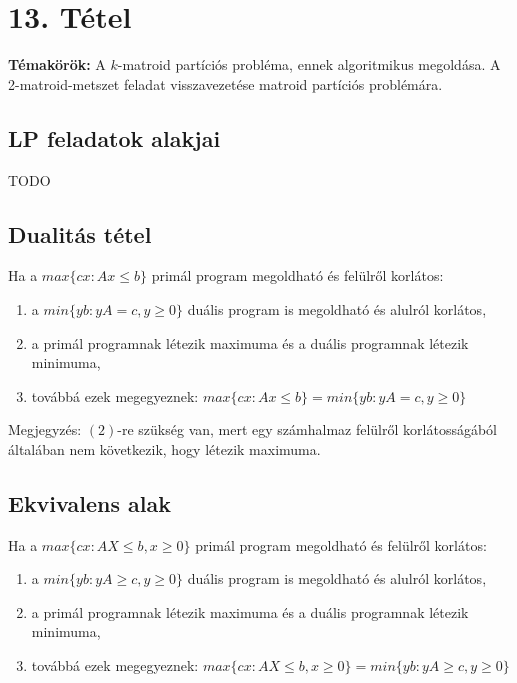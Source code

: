 
\setcounter{chapter}{13}
\chapter*{13. Tétel}

\textbf{Témakörök:} A $k$-matroid partíciós probléma, ennek algoritmikus megoldása. A 2-matroid-metszet feladat visszavezetése matroid partíciós problémára.

\noindent\hrulefill

\section*{LP feladatok alakjai}

\begin{theo} TODO \end{theo}

\section*{Dualitás tétel}

\begin{theo} 
Ha a $max \lbrace c x: Ax\leq b\rbrace$ primál program megoldható és felülről korlátos:
\begin{enumerate}
\item	a $min \lbrace yb: yA=c,y\geq 0\rbrace$ duális program is megoldható és alulról korlátos,
\item	a primál programnak létezik maximuma és a duális programnak létezik minimuma,
\item	továbbá ezek megegyeznek: $max\lbrace cx: Ax\leq b\rbrace = min\lbrace yb: yA=c,y\geq 0\rbrace$
\end{enumerate}
\end{theo}
Megjegyzés: $(2)$-re szükség van, mert egy számhalmaz felülről korlátosságából általában nem következik, hogy létezik maximuma.

\section*{Ekvivalens alak}
\begin{theo}
Ha a $max\lbrace cx:AX\leq b,x\geq 0\rbrace$ primál program megoldható és felülről korlátos:
\begin{enumerate}
\item a $min \lbrace yb:yA\geq c, y \geq 0\rbrace$ duális program is megoldható és alulról korlátos,
\item	a primál programnak létezik maximuma és a duális programnak létezik minimuma,
\item	továbbá ezek megegyeznek: $max\lbrace cx:AX\leq b,x\geq 0\rbrace = min \lbrace yb:yA\geq c, y \geq 0\rbrace$
\end{enumerate}
\end{theo}


